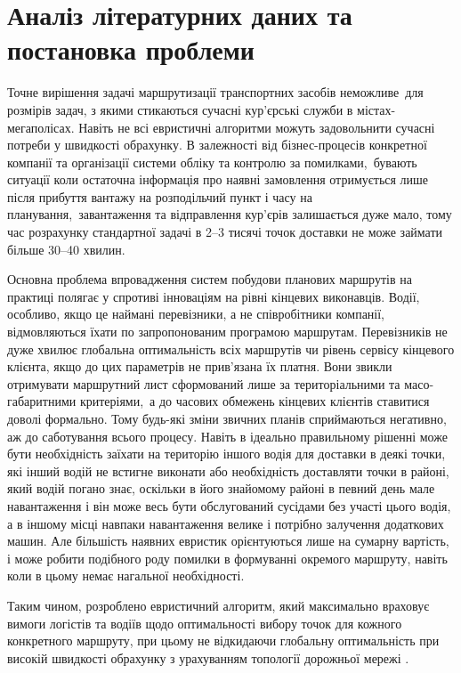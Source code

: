 \section{Аналіз літературних даних та постановка проблеми}

Точне вирішення задачі маршрутизації транспортних засобів неможливе для розмірів задач, з якими стикаються сучасні кур'єрські служби в містах-мегаполісах. Навіть не всі евристичні алгоритми можуть задовольнити сучасні потреби у швидкості обрахунку. В залежності від бізнес-процесів конкретної компанії та організації системи обліку та контролю за помилками, бувають ситуації коли остаточна інформація про наявні замовлення отримується лише після прибуття вантажу на розподільчий пункт і часу на планування, завантаження та відправлення кур'єрів залишається дуже мало, тому час розрахунку стандартної задачі в 2--3 тисячі точок доставки не може займати більше 30--40 хвилин.

Основна проблема впровадження систем побудови планових маршрутів на практиці полягає у спротиві інноваціям на рівні кінцевих виконавців. Водії, особливо, якщо це наймані перевізники, а не співробітники компанії, відмовляються їхати по запропонованим програмою маршрутам. Перевізників не дуже хвилює глобальна оптимальність всіх маршрутів чи рівень сервісу кінцевого клієнта, якщо до цих параметрів не прив'язана їх платня. Вони звикли отримувати маршрутний лист сформований лише за територіальними та масо-габаритними критеріями, а до часових обмежень кінцевих клієнтів ставитися доволі формально. Тому будь-які зміни звичних планів сприймаються негативно, аж до саботування всього процесу. Навіть в ідеально правильному рішенні може бути необхідність заїхати на територію іншого водія для доставки в деякі точки, які інший водій не встигне виконати або необхідність доставляти точки в районі, який водій погано знає, оскільки в його знайомому районі в певний день мале навантаження і він може весь бути обслугований сусідами без участі цього водія, а в іншому місці навпаки навантаження велике і потрібно залучення додаткових машин. Але більшість наявних евристик орієнтуються лише на сумарну вартість, і може робити подібного роду помилки в формуванні окремого маршруту, навіть коли в цьому немає нагальної необхідності.

Таким чином, розроблено евристичний алгоритм, який максимально враховує вимоги логістів та водіїв щодо оптимальності вибору точок для кожного конкретного маршруту, при цьому не відкидаючи глобальну оптимальність при високій швидкості обрахунку з урахуванням топології дорожньої мережі \cite{art1eng}. 

